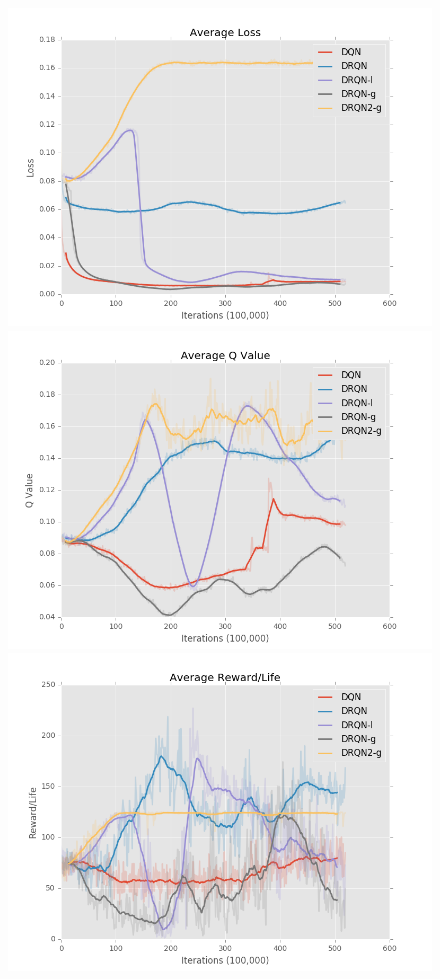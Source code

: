 \documentclass[final]{beamer}
\newlength{\onecolwid}
\newlength{\twocolwid}
\begin{document}
\begin{frame}[t]
\begin{columns}[t]
\begin{column}{\twocolwid}
\begin{columns}[t,totalwidth=\twocolwid]
\begin{column}{\onecolwid}
\begin{figure}[h]
    \centering
    \begin{minipage}{1.0\textwidth}
        \centering
        \includegraphics[scale=0.45]{avg_loss}
        \centering
        \includegraphics[scale=0.45]{avg_q}
        \centering
        \includegraphics[scale=0.45]{avg_reward}

\end{minipage}
\end{figure}
\end{column}
\end{columns}
\end{column}
\end{columns}
\end{frame}
\end{document}
